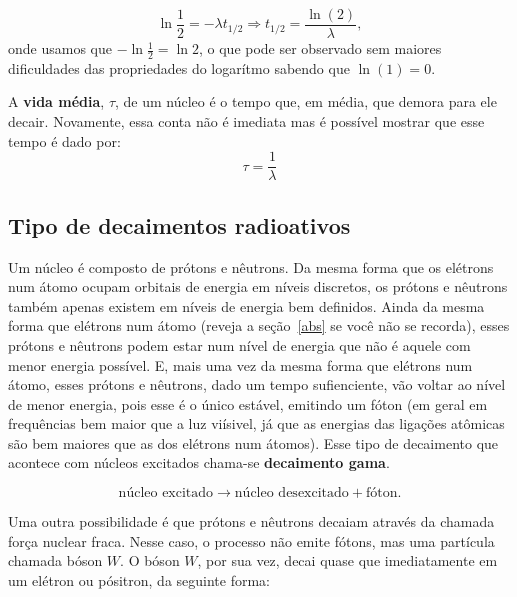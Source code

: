 \documentclass{article}
\begin{document}
\begin{equation}
\ln\frac{1}{2} = -\lambda t_{1/2} \Rightarrow t_{1/2} = \frac{\ln(2)}{\lambda},
\end{equation}
onde usamos que $-\ln\frac{1}{2} = \ln 2$, o que pode ser observado sem maiores dificuldades das propriedades do logar\'itmo sabendo que $\ln(1) = 0$.

A \textbf{vida m\'edia}, $\tau$, de um n\'ucleo \'e o tempo que, em m\'edia, que demora para ele decair. Novamente, essa conta n\~ao \'e imediata mas \'e poss\'ivel mostrar que esse tempo \'e dado por:
\begin{equation}
\tau = \frac{1}{\lambda}
\end{equation}

\subsection{Tipo de decaimentos radioativos}

Um n\'ucleo \'e composto de pr\'otons e n\^eutrons. Da mesma forma que os el\'etrons num \'atomo ocupam orbitais de energia em n\'iveis discretos, os pr\'otons e n\^eutrons tamb\'em apenas existem em n\'iveis de energia bem definidos. Ainda da mesma forma que el\'etrons num \'atomo (reveja a se\c c\~ao~\ref{abs} se voc\^e n\~ao se recorda), esses pr\'otons e n\^eutrons podem estar num n\'ivel de energia que n\~ao \'e aquele com menor energia poss\'ivel. E, mais uma vez da mesma forma que el\'etrons num \'atomo, esses pr\'otons e n\^eutrons, dado um tempo sufienciente, v\~ao voltar ao n\'ivel de menor energia, pois esse \'e o \'unico est\'avel, emitindo um f\'oton (em geral em frequ\^encias bem maior que a luz vi\'isivel, j\'a que as energias das liga\c c\~oes at\^omicas s\~ao bem maiores que as dos el\'etrons num \'atomos). Esse tipo de decaimento que acontece com n\'ucleos excitados chama-se \textbf{decaimento gama}.

\begin{equation}
\text{n\'ucleo excitado} \rightarrow \text{n\'ucleo desexcitado} + \text{f\'oton}.
\end{equation}

Uma outra possibilidade \'e que pr\'otons e n\^eutrons decaiam atrav\'es da chamada for\c ca nuclear fraca. Nesse caso, o processo n\~ao emite f\'otons, mas uma part\'icula chamada b\'oson $W$. O b\'oson $W$, por sua vez, decai quase que imediatamente em um el\'etron ou p\'ositron, da seguinte forma:
\end{document}
